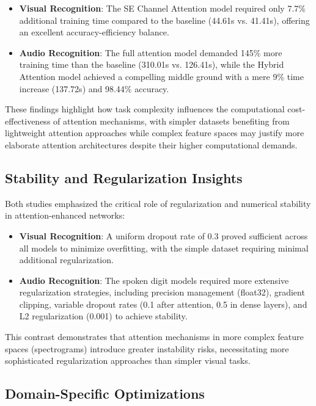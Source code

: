 \documentclass[12pt]{article}
\begin{document}
\begin{itemize}
    \item \textbf{Visual Recognition}: The SE Channel Attention model required only 7.7\% additional training time compared to the baseline (44.61s vs. 41.41s), offering an excellent accuracy-efficiency balance.
    
    \item \textbf{Audio Recognition}: The full attention model demanded 145\% more training time than the baseline (310.01s vs. 126.41s), while the Hybrid Attention model achieved a compelling middle ground with a mere 9\% time increase (137.72s) and 98.44\% accuracy.\\
\end{itemize}
These findings highlight how task complexity influences the computational cost-effectiveness of attention mechanisms, with simpler datasets benefiting from lightweight attention approaches while complex feature spaces may justify more elaborate attention architectures despite their higher computational demands.

\subsection{Stability and Regularization Insights}

Both studies emphasized the critical role of regularization and numerical stability in attention-enhanced networks:

\begin{itemize}
    \item \textbf{Visual Recognition}: A uniform dropout rate of 0.3 proved sufficient across all models to minimize overfitting, with the simple dataset requiring minimal additional regularization.
    
    \item \textbf{Audio Recognition}: The spoken digit models required more extensive regularization strategies, including precision management (float32), gradient clipping, variable dropout rates (0.1 after attention, 0.5 in dense layers), and L2 regularization (0.001) to achieve stability.\\
\end{itemize}
This contrast demonstrates that attention mechanisms in more complex feature spaces (spectrograms) introduce greater instability risks, necessitating more sophisticated regularization approaches than simpler visual tasks.

\subsection{Domain-Specific Optimizations}
\end{document}
